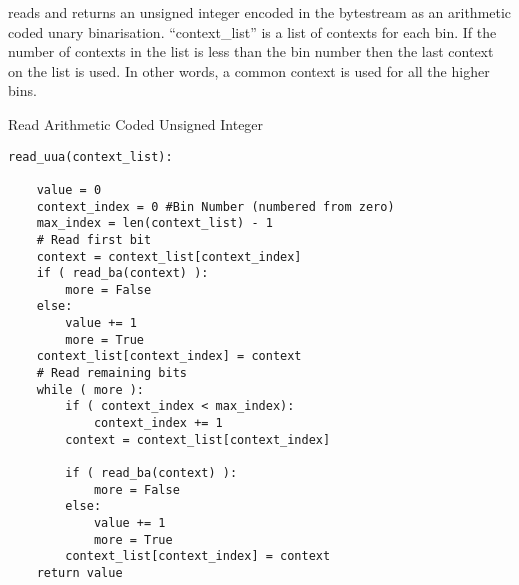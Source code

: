 \begin{comment}
Pseudo-code for unsigned unary arithmetic decoding uu\_arith\_decode() is
as follows:

VALUE=0

while ( !binary\_arith\_decode( choose\_context() ) )

    VALUE++

choose\_context() is a function that produces a context with which the
binary bit shall be decoded. The value it returns can depend on any
values known to the decoder at the time it is called, especially
including the binarisation bin (the bin number is equal to VALUE+1
according to the conventions of Appendix).
\end{comment}


reads and returns an unsigned integer encoded in the bytestream as an
arithmetic coded unary binarisation. ``context\_list'' is a list of
contexts for each bin. If the number of contexts in the list is less
than the bin number then the last context on the list is used. In other
words, a
common context is used for all the higher bins.

Read Arithmetic Coded Unsigned Integer
\begin{verbatim}
read_uua(context_list):

    value = 0
    context_index = 0 #Bin Number (numbered from zero)
    max_index = len(context_list) - 1
    # Read first bit
    context = context_list[context_index]
    if ( read_ba(context) ):
        more = False
    else:
        value += 1
        more = True
    context_list[context_index] = context
    # Read remaining bits
    while ( more ):
        if ( context_index < max_index):
            context_index += 1
        context = context_list[context_index]

        if ( read_ba(context) ):
            more = False
        else:
            value += 1
            more = True
        context_list[context_index] = context
    return value
\end{verbatim}
